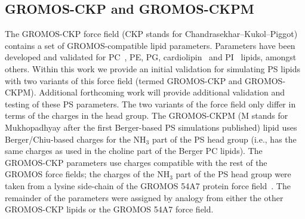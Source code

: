 \documentclass[journal=jpcbfk,manuscript=article]{achemso}
\newcommand{\todo}[1]{\textcolor{red}{#1}}
\begin{document}
\subsection{GROMOS-CKP and GROMOS-CKPM}
The GROMOS-CKP force field (CKP stands for Chandrasekhar--Kukol--Piggot) contains a set of GROMOS-compatible lipid parameters.
Parameters have been developed and validated for PC~\cite{Chandrasekhar03,kukol09,piggot12},
PE, PG, cardiolipin~\cite{piggot11}
and PI~\cite{holdbrook10}
lipids, amongst others.
Within this work we provide an initial validation for simulating PS lipids with two variants of
this force field (termed GROMOS-CKP and GROMOS-CKPM). Additional forthcoming work will provide additional
validation and testing of these PS parameters. The two variants of the force field only differ in terms
of the charges in the head group. The GROMOS-CKPM (M stands for Mukhopadhyay after the first
Berger-based PS simulations published) %
lipid uses Berger/Chiu-based charges
for the NH$_3$ part of the PS head group (i.e., has the same charges as used in the choline part of the Berger PC lipids).
The GROMOS-CKP parameters use charges compatible with the rest of the GROMOS force fields;
the  charges of the NH$_3$ part of the PS head group were taken from a lysine side-chain of the GROMOS 54A7 protein
force field~\cite{schmid11}. %
The remainder of the parameters were assigned by analogy from either the other GROMOS-CKP lipids or the GROMOS 54A7 force field.
\end{document}
